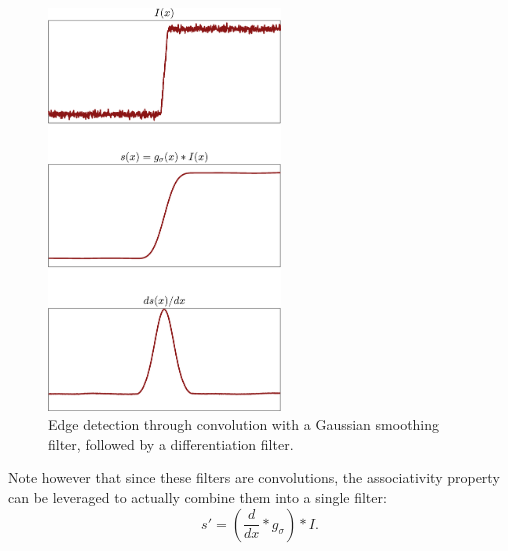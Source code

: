 \begin{figure}[ht!]
  \centering
  \includegraphics[width=0.55\textwidth]{tex/figs/ch10_figs/edge_detection_smooth.png}
    \caption{Edge detection through convolution with a Gaussian smoothing filter, followed by a differentiation filter.}
    \label{fig:gauss}
\end{figure}
Note however that since these filters are convolutions, the associativity property can be leveraged to actually combine them into a single filter:
\begin{equation*}
s'=(\frac{d}{dx} * g_\sigma) * I.
\end{equation*}

